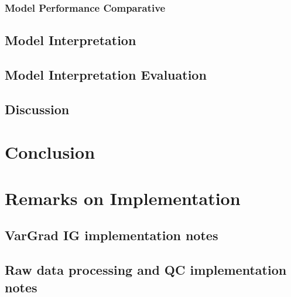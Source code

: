 \documentclass[biblatexBackend=bibtex]{tumthesis}
\begin{document}
\subsection{Model Performance Comparative}
\label{sec:results:comparative}


\section{Model Interpretation}
\label{sec:results:model_interpretation}

\section{Model Interpretation Evaluation}
\label{sec:results:model_inter_eval}

\section{Discussion}

\chapter{Conclusion}
\label{ch:Conclusion}


\appendix

\chapter{Remarks on Implementation}
\label{Appendix-Implementation}


\section{VarGrad IG implementation notes}
\label{sec:appendix:VarGrad_IG_Experimental_Setup}


\section{Raw data processing and QC implementation notes}
\label{sec:appendix:raw_data}

\end{document}
